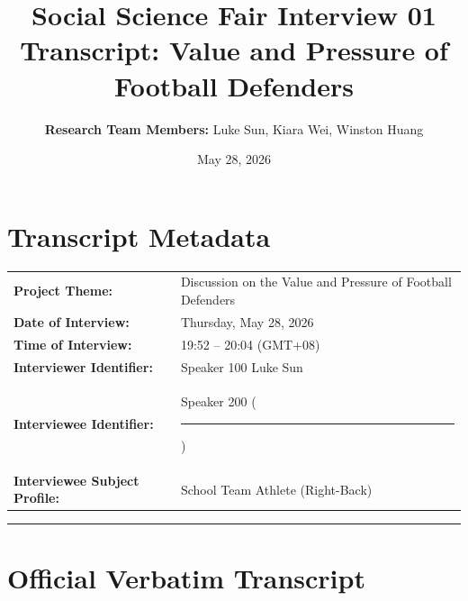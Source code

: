 \documentclass[11pt,a4paper]{article}
\title{\textbf{Social Science Fair Interview 01 \\ Transcript: Value and Pressure of Football Defenders}}
\author{\textbf{Research Team Members:} Luke Sun, Kiara Wei, Winston Huang}
\date{May 28, 2026}
\newcommand{\redacted}{\rule{2.5cm}{2ex}}
\begin{document}
\maketitle

\section*{Transcript Metadata}
\begin{tabular}{ll}
    \textbf{Project Theme:} & Discussion on the Value and Pressure of Football Defenders \\
    \textbf{Date of Interview:} & Thursday, May 28, 2026 \\
    \textbf{Time of Interview:} & 19:52 -- 20:04 (GMT+08) \\
    \textbf{Interviewer Identifier:} & Speaker 100 Luke Sun\\
    \textbf{Interviewee Identifier:} & Speaker 200 (\redacted) \\
    \textbf{Interviewee Subject Profile:} & School Team Athlete (Right-Back)
\end{tabular}

\vspace{2em}
\hrule
\vspace{1.5em}

\section*{Official Verbatim Transcript}
\end{document}
